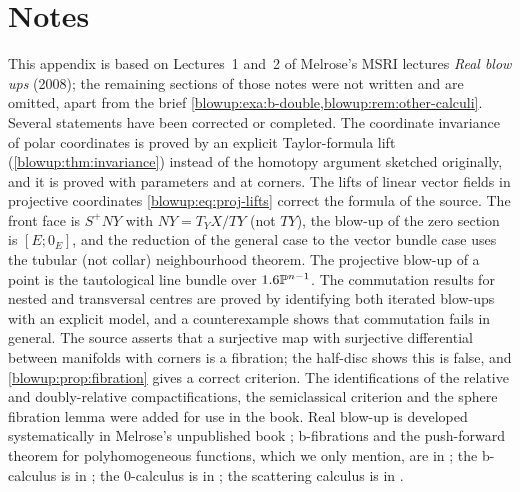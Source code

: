 \section*{Notes}
This appendix is based on Lectures~1 and~2 of Melrose's MSRI lectures \emph{Real blow
ups} (2008); the remaining sections of those notes were not written and are omitted, apart
from the brief \cref{blowup:exa:b-double,blowup:rem:other-calculi}. Several statements
have been corrected or completed. The coordinate invariance of polar coordinates is proved
by an explicit Taylor-formula lift (\cref{blowup:thm:invariance}) instead of the
homotopy argument sketched originally, and it is proved with parameters and at corners.
The lifts of linear vector fields in projective coordinates
\eqref{blowup:eq:proj-lifts} correct the formula of the source. The front face is
$S^+NY$ with $NY=T_YX/TY$ (not $TY$), the blow-up of the zero section is $[E;0_E]$, and
the reduction of the general case to the vector bundle case uses the tubular (not collar)
neighbourhood theorem. The projective blow-up of a point is the tautological line bundle
over $1.6\mathbb P^{n-1}$. The commutation results for nested and transversal centres are
proved by identifying both iterated blow-ups with an explicit model, and a counterexample
shows that commutation fails in general. The source asserts that a surjective map with
surjective differential between manifolds with corners is a fibration; the half-disc shows
this is false, and \cref{blowup:prop:fibration} gives a correct criterion. The
identifications of the relative and doubly-relative compactifications, the semiclassical
criterion and the sphere fibration lemma were added for use in the book. Real blow-up is
developed systematically in Melrose's unpublished book \cite{Melrose-corners}; b-fibrations
and the push-forward theorem for polyhomogeneous functions, which we only mention, are in
\cite{Melrose-pushforward}; the b-calculus is in \cite{Melrose-APS}; the $0$-calculus is in
\cite{Mazzeo-Melrose}; the scattering calculus is in \cite{Melrose-scattering}.

